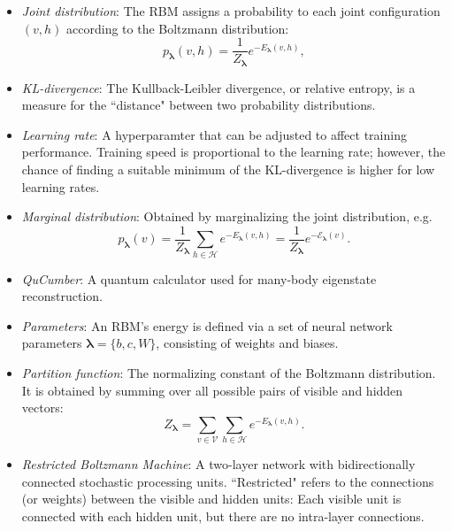 \documentclass[submission, Phys]{SciPost}
\begin{document}
\begin{itemize}
	\item {\it Joint distribution}: The RBM assigns a probability to each joint configuration $(v,h)$ according to the Boltzmann distribution:
	      \begin{equation}
		      p_{\bm{\lambda}}(v,h) = \frac{1}{Z_{\bm{\lambda}}} e^{-E_{\bm{\lambda}}(v,h)},
	      \end{equation}
	      
	      \item{\it KL-divergence}: The Kullback-Leibler divergence, or relative entropy, is a measure for the ``distance" between two probability distributions.

\item{\it Learning rate}: A hyperparamter that can be adjusted to affect training performance.  Training speed is proportional to the learning rate; however, the chance of finding a suitable minimum of the KL-divergence is higher for low learning rates.


	\item {\it Marginal distribution}: Obtained by marginalizing the joint distribution, e.g.
	      \begin{equation}
		      \label{Eq:marginal_distribution}
		      p_{\bm{\lambda}}(v) = \frac{1}{Z_{\bm{\lambda}}} \sum\limits_{h\in \mathcal{H}} e^{-E_{\bm{\lambda}}(v,h)} = \frac{1}{Z_{\bm{\lambda}}} e^{- \mathcal{E}_{\bm{\lambda}}(v)}.
	      \end{equation}

	\item {\it QuCumber}: A quantum calculator used for many-body eigenstate reconstruction.

	\item {\it Parameters}: An RBM's energy is defined via a set of neural network parameters $\bm{\lambda} = \{b,c,W\}$, consisting of weights and biases.

	\item {\it Partition function}: The normalizing constant of the Boltzmann distribution. It is obtained by summing over all possible pairs of visible and hidden vectors:
	      \begin{equation}
		      Z_{\bm{\lambda}} = \sum\limits_{v\in \mathcal{V}}\sum\limits_{h\in \mathcal{H}} e^{-E_{\bm{\lambda}}(v,h)}.
	      \end{equation}

	\item {\it Restricted Boltzmann Machine}: A two-layer network with bidirectionally connected stochastic processing units. ``Restricted" refers to the connections (or weights) between the visible and hidden units: Each visible unit is connected with each hidden unit, but there are no intra-layer connections.


\end{itemize}
\end{document}
